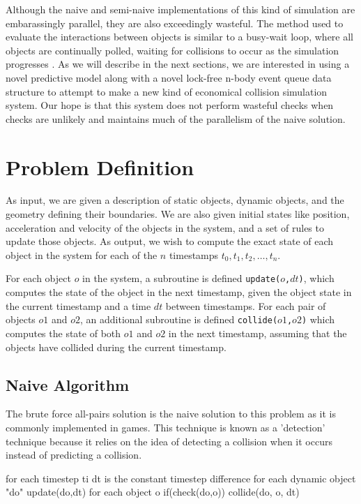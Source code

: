 \documentclass[conference]{IEEEtran}
\begin{document}
Although the naive and semi-naive implementations of this kind of simulation are embarassingly parallel, they are also exceedingly wasteful.  The method used to evaluate the interactions between objects is similar to a busy-wait loop, where all objects are continually polled, waiting for collisions to occur as the simulation progresses \cite{nbodycollisions,Moore88collisiondetection}.   As we will describe in the next sections, we are interested in using a novel predictive model along with a novel lock-free n-body event queue data structure to attempt to make a new kind of economical collision simulation system.  Our hope is that this system does not perform wasteful checks when checks are unlikely and maintains much of the parallelism of the naive solution.

\section{Problem Definition}

As input, we are given a description of static objects, dynamic objects, and the geometry defining their boundaries.  We are also given initial states like position, acceleration and velocity of the objects in the system, and a set of rules to update those objects.  As output, we wish to compute the exact state of each object in the system for each of the $n$ timestamps $t_0, t_1, t_2, \ldots, t_n$.

For each object $o$ in the system, a subroutine is defined \texttt{update($o$,$dt$)}, which computes the state of the object in the next timestamp, given the object state in the current timestamp and a time $dt$ between timestamps.  For each pair of objects $o1$ and $o2$, an additional subroutine is defined \texttt{collide($o1$,$o2$)} which computes the state of both $o1$ and $o2$ in the next timestamp, assuming that the objects have collided during the current timestamp.

\subsection{Naive Algorithm}

The brute force all-pairs solution is the naive solution to this problem as it is commonly implemented in games. This technique is known as a 'detection' technique because it relies on the idea of detecting a collision when it occurs instead of predicting a collision.  

\begin{verbatimtab}[3]
for each timestep ti
	dt is the constant timestep difference
	for each dynamic object "do"
		update(do,dt)		
		for each object  o
			if(check(do,o))
				collide(do, o, dt)
\end{verbatimtab}
\end{document}
